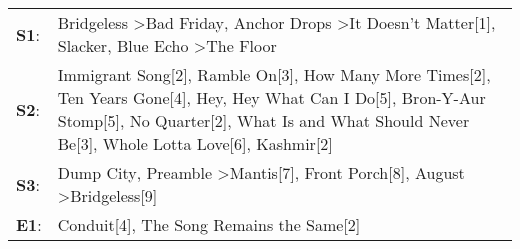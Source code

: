 \begin{supertabular}{p{0.03\textwidth}p{0.92\textwidth}}
 \textbf{S1}:  &                                                                                                                                                                     Bridgeless\textsuperscript{} \textgreater \enspace Bad Friday\textsuperscript{}, \enspace Anchor Drops\textsuperscript{} \textgreater \enspace It Doesn't Matter[1]\textsuperscript{}, \enspace Slacker\textsuperscript{}, \enspace Blue Echo\textsuperscript{} \textgreater \enspace The Floor\textsuperscript{}  \enspace  \\
 \textbf{S2}:  &  Immigrant Song[2]\textsuperscript{}, \enspace Ramble On[3]\textsuperscript{}, \enspace How Many More Times[2]\textsuperscript{}, \enspace Ten Years Gone[4]\textsuperscript{}, \enspace Hey, Hey What Can I Do[5]\textsuperscript{}, \enspace Bron-Y-Aur Stomp[5]\textsuperscript{}, \enspace No Quarter[2]\textsuperscript{}, \enspace What Is and What Should Never Be[3]\textsuperscript{}, \enspace Whole Lotta Love[6]\textsuperscript{}, \enspace Kashmir[2]\textsuperscript{}  \enspace  \\
 \textbf{S3}:  &                                                                                                                                                                                                                                Dump City\textsuperscript{}, \enspace Preamble\textsuperscript{} \textgreater \enspace Mantis[7]\textsuperscript{}, \enspace Front Porch[8]\textsuperscript{}, \enspace August\textsuperscript{} \textgreater \enspace Bridgeless[9]\textsuperscript{}  \enspace  \\
 \textbf{E1}:  &                                                                                                                                                                                                                                                                                                                                                                                                 Conduit[4]\textsuperscript{}, \enspace The Song Remains the Same[2]\textsuperscript{}  \enspace  \\
\end{supertabular}
